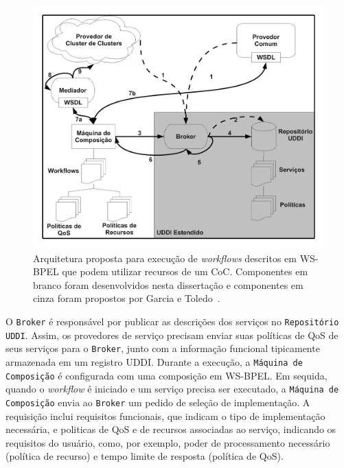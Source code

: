 \documentclass[12pt]{report} %
\begin{document}
	\begin{figure}[!htb]%
	    \begin{center}
		\includegraphics[scale=0.5]{imagens/execComposicaoG.pdf} 
		\caption[Arquitetura proposta para execução de \textit{workflows} descritos em WS-BPEL que podem utilizar recursos de um CoC.]{Arquitetura proposta para execução de \textit{workflows} descritos em WS-BPEL que podem utilizar recursos de um CoC. Componentes em branco foram desenvolvidos nesta dissertação e componentes em cinza foram propostos por Garcia e Toledo~\cite{DiegoUDDI}.}
		\label{fig:ArqComposicaoGen}
	    \end{center}
	\end{figure}
    
	O \texttt{Broker} é responsável por publicar as descrições dos serviços no \texttt{Repositório UDDI}.    
	Assim, os provedores de serviço precisam enviar suas políticas de QoS de seus serviços para o \texttt{Broker}, junto com a informação funcional tipicamente armazenada em um registro UDDI.
	Durante a execução, a \texttt{Máquina de Composição} é configurada com uma composição em WS-BPEL.
	Em sequida, quando o \textit{workflow} é iniciado e um serviço precisa ser executado, a \texttt{Máquina de Composição} envia ao \texttt{Broker} um pedido de seleção de implementação.
	A requisição inclui requisitos funcionais, que indicam o tipo de implementação necessária, e politicas de QoS e de recursos associadas ao serviço, indicando os requisitos do usuário, como, por exemplo, poder de processamento necessário (política de recurso) e tempo limite de resposta (política de QoS).
\end{document}
